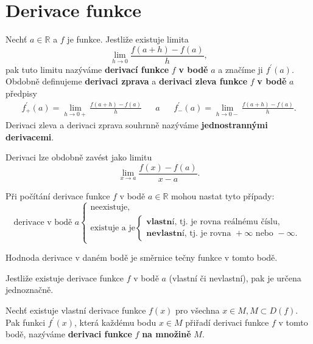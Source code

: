 \section{Derivace funkce}
\begin{definition}\label{derivace}
Nechť $a \in \mathbb R$ a $f$ je funkce. Jestliže existuje limita
$$\lim_{h\to 0} \frac{f(a+h)-f(a)}{h},$$
pak tuto limitu nazýváme \textbf{derivací funkce} $f$ \textbf{v bodě} $a$ a značíme ji $f^\prime (a).$
Obdobně definujeme \textbf{derivaci zprava} a \textbf{derivaci zleva funkce} $f$ \textbf{v bodě}
$a$ předpisy
\begin{align*}
    f_+^\prime(a) = \lim_{h\to 0+} \frac{f(a+h)-f(a)}{h} & & a & & f_-^\prime(a) = \lim_{h\to 0-} \frac{f(a+h)-f(a)}{h}.
\end{align*}
Derivaci zleva a derivaci zprava souhrnně nazýváme \textbf{jednostrannými derivacemi}.
\end{definition}

\begin{pozn}
    Derivaci lze obdobně zavést jako limitu
    $$\lim_{x\to a} \frac{f(x)-f(a)}{x-a}.$$
\end{pozn}

\begin{pozn}
     Při počítání derivace funkce $f$ v bodě $a\in \mathbb R$ mohou nastat
     tyto případy:
     $$
     \textrm{derivace v bodě } a \begin{cases}
        \textrm{neexistuje,} \\
        \textrm{existuje a je} \begin{cases}
            \textbf{vlastní}\textrm{, tj. je rovna reálnému číslu}, \\
            \textbf{nevlastní}\textrm{, tj. je rovna } +\infty \textrm{ nebo } - \infty.
        \end{cases}
     \end{cases}
     $$
\end{pozn}

\begin{pozn}
    Hodnoda derivace v daném bodě je směrnice tečny funkce v tomto bodě.
\end{pozn}

\begin{veta}
    Jestliže existuje derivace funkce $f$ v bodě $a$ (vlastní či nevlastní),
    pak je určena jednoznačně.
\end{veta}

\begin{definition}
Nechť existuje vlastní derivace funkce $f(x)$ pro všechna $x\in M, M\subset D(f).$
Pak funkci $f^\prime(x)$, která každému bodu $x\in M$ přiřadí derivaci funkce $f$
v tomto bodě, nazýváme \textbf{derivaci funkce} $f$ \textbf{na množině} $M.$
\end{definition}


